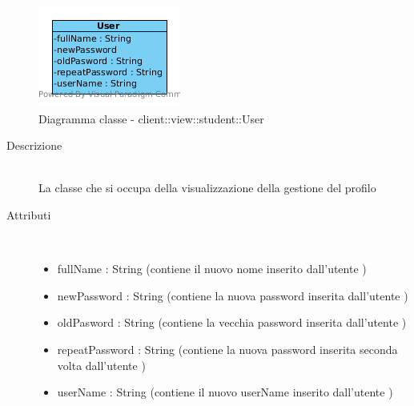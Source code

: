 \vspace{0.5cm}
\hypertarget{client::view::student::User}{}
\begin{center}
			\begin{figure}[H]
				\centering \includegraphics[scale=4, max width=\textwidth, max height=\myheight]{../img/diagrammiClassi/client/view/student/User.png}
				\caption{Diagramma classe - client::view::student::User}
			\end{figure}
		\end{center}\begin{description}
\item[Descrizione] \hfill \\
 La classe che si occupa della visualizzazione della gestione del profilo
\item[Attributi] \hfill \\
 \vspace{-7mm}
\begin{itemize}
\item fullName : String (contiene il nuovo nome  inserito dall'utente )
\item newPassword : String (contiene la nuova password inserita dall'utente )
\item oldPasword : String (contiene la vecchia password inserita dall'utente )
\item repeatPassword : String (contiene la nuova password inserita seconda volta dall'utente )
\item userName : String (contiene il nuovo userName inserito dall'utente )
\end{itemize}

\end{description}

